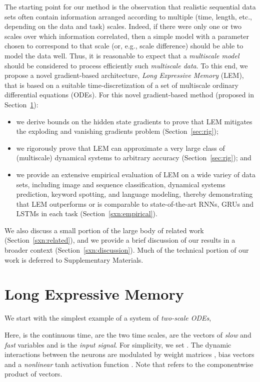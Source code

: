 \documentclass{article} \usepackage{iclr2022_conference,times}
\begin{document}
The starting point for our method is the observation that realistic sequential data sets often contain information arranged according to multiple (time, length, etc., depending on the data and task) scales. 
Indeed, if there were only one or two scales over which information correlated, then a simple model with a parameter chosen to correspond to that scale (or, e.g., scale difference) should be able to model the data well.
Thus, it is reasonable to expect that a \emph{multiscale model} should be considered to process efficiently such \emph{multiscale data}. 
To this end, we propose a novel gradient-based architecture, \emph{Long Expressive Memory} (LEM), that is based on a suitable time-discretization of a set of multiscale ordinary differential equations (ODEs). 
For this novel gradient-based method (proposed in Section~\ref{sxn:lem}): 
\begin{itemize}
    \item 
    we derive bounds on the hidden state gradients to prove that LEM mitigates the exploding and vanishing gradients problem (Section~\ref{sec:rig});
    \item 
    we rigorously prove that LEM can approximate a very large class of (multiscale) dynamical systems to arbitrary accuracy (Section~\ref{sec:rig}); and
    \item 
    we provide an extensive empirical evaluation of LEM on a wide variey of data sets, including image and sequence classification, dynamical systems prediction, keyword spotting, and language modeling, thereby demonstrating that LEM outperforms or is comparable to state-of-the-art RNNs, GRUs and LSTMs in each task (Section~\ref{sxn:empirical}).  
\end{itemize}
We also discuss a small portion of the large body of related work (Section~\ref{sxn:related}), and we provide a brief discussion of our results in a broader context (Section~\ref{sxn:discussion}). 
Much of the technical portion of our work is deferred to Supplementary Materials.


\section{Long Expressive Memory}
\label{sxn:lem}

We start with the simplest example of a system of \emph{two-scale ODEs},

Here,  is the continuous time,  are the two time scales,  are the vectors of \emph{slow} and \emph{fast} variables and  is the \emph{input signal}. For simplicity, we set . The dynamic interactions between the neurons are modulated by weight matrices , bias vectors  and a \emph{nonlinear} tanh activation function . Note that  refers to the componentwise product of vectors.
\end{document}
